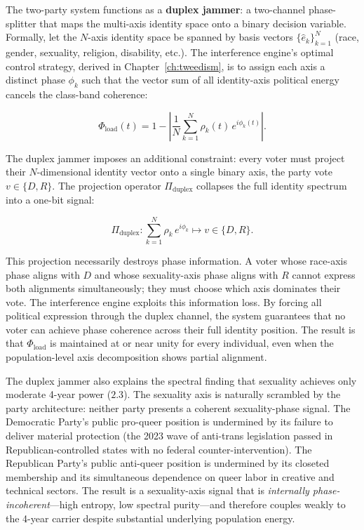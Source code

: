The two-party system functions as a \textbf{duplex jammer}: a two-channel phase-splitter that maps the multi-axis identity space onto a binary decision variable. Formally, let the $N$-axis identity space be spanned by basis vectors $\{\hat{e}_k\}_{k=1}^N$ (race, gender, sexuality, religion, disability, etc.). The interference engine's optimal control strategy, derived in Chapter~\ref{ch:tweedism}, is to assign each axis a distinct phase $\phi_k$ such that the vector sum of all identity-axis political energy cancels the class-band coherence:

\begin{equation}\label{eq:21.8-duplex-phase}
\Phi_{\text{load}}(t) = 1 - \left| \frac{1}{N} \sum_{k=1}^{N} \rho_k(t) \, e^{i\phi_k(t)} \right|.
\end{equation}

The duplex jammer imposes an additional constraint: every voter must project their $N$-dimensional identity vector onto a single binary axis, the party vote $v \in \{D, R\}$. The projection operator $\Pi_{\text{duplex}}$ collapses the full identity spectrum into a one-bit signal:

\begin{equation}\label{eq:21.9-duplex-projection}
\Pi_{\text{duplex}}: \sum_{k=1}^{N} \rho_k \, e^{i\phi_k} \mapsto v \in \{D, R\}.
\end{equation}

This projection necessarily destroys phase information. A voter whose race-axis phase aligns with $D$ and whose sexuality-axis phase aligns with $R$ cannot express both alignments simultaneously; they must choose which axis dominates their vote. The interference engine exploits this information loss. By forcing all political expression through the duplex channel, the system guarantees that no voter can achieve phase coherence across their full identity position. The result is that $\Phi_{\text{load}}$ is maintained at or near unity for every individual, even when the population-level axis decomposition shows partial alignment.

The duplex jammer also explains the spectral finding that sexuality achieves only moderate 4-year power ($2.3$). The sexuality axis is naturally scrambled by the party architecture: neither party presents a coherent sexuality-phase signal. The Democratic Party's public pro-queer position is undermined by its failure to deliver material protection (the 2023 wave of anti-trans legislation passed in Republican-controlled states with no federal counter-intervention). The Republican Party's public anti-queer position is undermined by its closeted membership and its simultaneous dependence on queer labor in creative and technical sectors. The result is a sexuality-axis signal that is \textit{internally phase-incoherent}---high entropy, low spectral purity---and therefore couples weakly to the 4-year carrier despite substantial underlying population energy.


